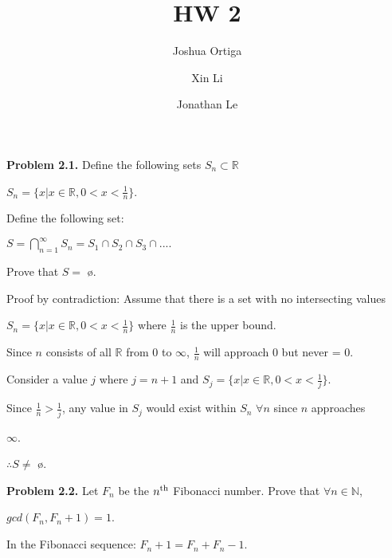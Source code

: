 \documentclass{article}
\title{HW 2}
\author{Joshua Ortiga \\
		\and
		Xin Li \\
		\and
		Jonathan Le}
\begin{document}
\maketitle
\textbf{Problem 2.1.} Define the following sets $S_n \subset \mathbb{R}$

\begin{center}
	$S_n = \{x|x \in \mathbb{R}, 0 < x < \frac{1}{n}\}$.
\end{center}

\hspace{1cm} Define the following set:

\begin{center}
	$S = \displaystyle\bigcap_{n=1}^{\infty} S_n = S_1 \cap S_2 \cap S_3 \cap ....$
\end{center}

\hspace{1cm} Prove that $S = $ \o.

\vspace{0.5cm}

Proof by contradiction: Assume that there is a set with no intersecting values 

\vspace{0.2cm}

$S_n = \{ x | x \in \mathbb{R}, 0 < x < \frac{1}{n}\}$ where $\frac{1}{n}$ is the upper bound.

\vspace{0.2cm}

Since $n$ consists of all $\mathbb{R}$ from 0 to $\infty$, $\frac{1}{n}$ will approach 0 but never = 0.

\vspace{0.2cm}

Consider a value $j$ where $j=n+1$ and $S_j = \{x|x \in \mathbb{R}, 0 < x < \frac{1}{j} \}$.

Since $\frac{1}{n} > \frac{1}{j}$, any value in $S_j$ would exist within $S_n$ $\forall n$ since $n$ approaches 

$\infty$.

$\therefore S \not = $ \o.

\vspace{0.5cm}

\textbf{Problem 2.2.} Let $F_n$ be the $n\textsuperscript{th}$ Fibonacci number. Prove that $\forall n \in \mathbb{N}$, 

$gcd(F_n,F_n+1) = 1$.

\vspace{0.3cm}

In the Fibonacci sequence: $F_n+1 = F_n + F_n-1$.
\end{document}

